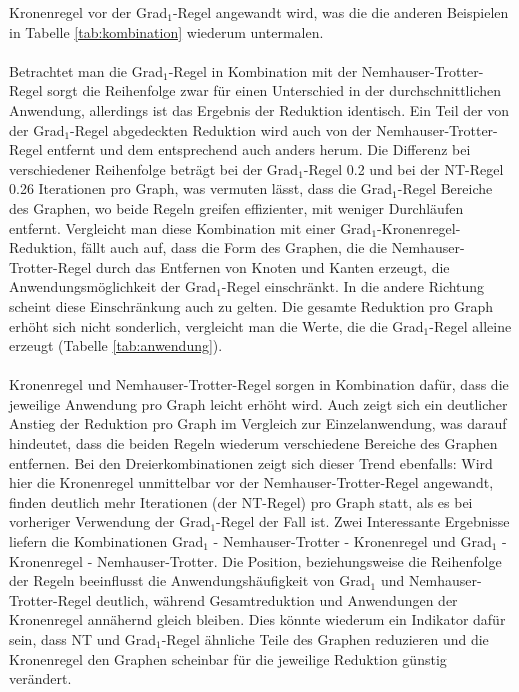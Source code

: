 Kronenregel vor der Grad$_{1}$-Regel angewandt wird, was die die anderen Beispielen in Tabelle \ref{tab:kombination} wiederum untermalen.\\ \\
Betrachtet man die Grad$_{1}$-Regel in Kombination mit der Nemhauser-Trotter-Regel sorgt die Reihenfolge zwar für einen Unterschied in der durchschnittlichen Anwendung, allerdings ist das Ergebnis der Reduktion identisch. Ein Teil der von der Grad$_{1}$-Regel abgedeckten Reduktion wird auch von der Nemhauser-Trotter-Regel entfernt und dem entsprechend auch anders herum. Die Differenz bei verschiedener Reihenfolge beträgt bei der Grad$_{1}$-Regel 0.2 und bei der NT-Regel 0.26 Iterationen pro Graph, was vermuten lässt, dass die Grad$_{1}$-Regel Bereiche des Graphen, wo beide Regeln greifen effizienter, mit weniger Durchläufen entfernt. Vergleicht man diese Kombination mit einer Grad$_{1}$-Kronenregel-Reduktion, fällt auch auf, dass die Form des Graphen, die die Nemhauser-Trotter-Regel durch das Entfernen von Knoten und Kanten erzeugt, die Anwendungsmöglichkeit der Grad$_{1}$-Regel einschränkt. In die andere Richtung scheint diese Einschränkung auch zu gelten. Die gesamte Reduktion pro Graph erhöht sich nicht sonderlich, vergleicht man die Werte, die die Grad$_{1}$-Regel alleine erzeugt (Tabelle \ref{tab:anwendung}). \\ \\
Kronenregel und Nemhauser-Trotter-Regel sorgen in Kombination dafür, dass die jeweilige Anwendung pro Graph leicht erhöht wird. Auch zeigt sich ein deutlicher Anstieg der Reduktion pro Graph im Vergleich zur Einzelanwendung, was darauf hindeutet, dass die beiden Regeln wiederum verschiedene Bereiche des Graphen entfernen. Bei den Dreierkombinationen zeigt sich dieser Trend ebenfalls: Wird hier die Kronenregel unmittelbar vor der Nemhauser-Trotter-Regel angewandt, finden deutlich mehr Iterationen (der NT-Regel) pro Graph statt, als es bei vorheriger Verwendung der Grad$_{1}$-Regel der Fall ist. Zwei Interessante Ergebnisse liefern die Kombinationen Grad$_{1}$ - Nemhauser-Trotter - Kronenregel und Grad$_{1}$ - Kronenregel - Nemhauser-Trotter. Die Position, beziehungsweise die Reihenfolge der Regeln beeinflusst die Anwendungshäufigkeit von Grad$_{1}$ und Nemhauser-Trotter-Regel deutlich, während Gesamtreduktion und Anwendungen der Kronenregel annähernd gleich bleiben. Dies könnte wiederum ein Indikator dafür sein, dass NT und Grad$_{1}$-Regel ähnliche Teile des Graphen reduzieren und die Kronenregel den Graphen scheinbar für die jeweilige Reduktion günstig verändert.
